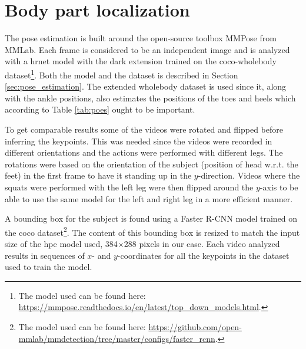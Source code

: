 \section{Body part localization} \label{sec:met-loc}
The pose estimation is built around the open-source toolbox MMPose \cite{mmpose} from MMLab. Each frame is considered to be an independent image and is analyzed with a \gls{hrnet} model with the \gls{dark} extension trained on the \gls{coco}-wholebody dataset\footnote{The model used can be found here: \url{https://mmpose.readthedocs.io/en/latest/top_down_models.html}.}. Both the model and the dataset is described in Section \ref{sec:pose_estimation}. The extended wholebody dataset is used since it, along with the ankle positions, also estimates the positions of the toes and heels which according to Table \ref{tab:poes} ought to be important. %

To get comparable results some of the videos were rotated and flipped before inferring the keypoints. This was needed since the videos were recorded in different orientations and the actions were performed with different legs. The rotations were based on the orientation of the subject (position of head w.r.t. the feet) in the first frame to have it standing up in the $y$-direction. Videos where the squats were performed with the left leg were then flipped around the $y$-axis to be able to use the same model for the left and right leg in a more efficient manner.

A bounding box for the subject is found using a Faster R-CNN model trained on the \gls{coco} dataset\footnote{The model used can be found here: \url{https://github.com/open-mmlab/mmdetection/tree/master/configs/faster_rcnn}.}. The content of this bounding box is resized to match the input size of the \gls{hpe} model used, 384$\times$288 pixels in our case. Each video analyzed results in sequences of $x$- and $y$-coordinates for all the keypoints in the dataset used to train the model.

